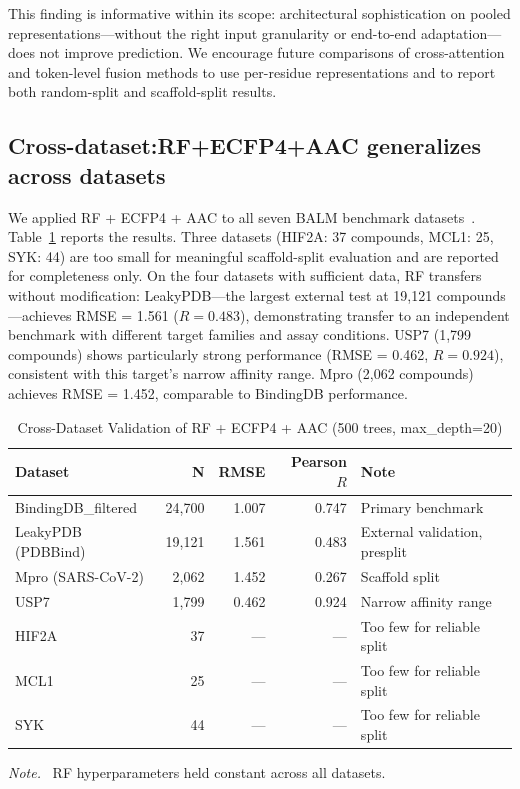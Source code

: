 \documentclass[pmlr,twocolumn]{jmlr}
\newcommand{\tablenote}[1]{%
  \vspace{4pt}%
  \begin{minipage}{0.95\linewidth}%
    \footnotesize\raggedright\emph{Note.}~#1\par%
  \end{minipage}%
}
\begin{document}
This finding is informative within its scope: architectural sophistication on pooled representations---without the right input granularity or end-to-end adaptation---does not improve prediction. We encourage future comparisons of cross-attention and token-level fusion methods to use per-residue representations and to report both random-split and scaffold-split results.

\subsection{Cross-dataset:RF+ECFP4+AAC generalizes across datasets}
\label{sec:cross_dataset}

We applied RF + ECFP4 + AAC to all seven BALM benchmark datasets~\citep{balm2024}. Table~\ref{tab:cross_dataset} reports the results. Three datasets (HIF2A: 37 compounds, MCL1: 25, SYK: 44) are too small for meaningful scaffold-split evaluation and are reported for completeness only. On the four datasets with sufficient data, RF transfers without modification: LeakyPDB---the largest external test at 19,121 compounds---achieves RMSE = 1.561 ($R = 0.483$), demonstrating transfer to an independent benchmark with different target families and assay conditions. USP7 (1,799 compounds) shows particularly strong performance (RMSE = 0.462, $R = 0.924$), consistent with this target's narrow affinity range. Mpro (2,062 compounds) achieves RMSE = 1.452, comparable to BindingDB performance.

\begin{table}[t]
\centering
\small
\caption{Cross-Dataset Validation of RF + ECFP4 + AAC (500 trees, max\_depth=20)}
\label{tab:cross_dataset}
\begin{tabular}{lrrrl}
\toprule
\textbf{Dataset} & \textbf{N} & \textbf{RMSE} & \textbf{Pearson $R$} & \textbf{Note} \\
\midrule
BindingDB\_filtered & 24,700 & 1.007 & 0.747 & Primary benchmark \\
LeakyPDB (PDBBind)  & 19,121 & 1.561 & 0.483 & External validation, presplit \\
Mpro (SARS-CoV-2)   & 2,062  & 1.452 & 0.267 & Scaffold split \\
USP7                & 1,799  & 0.462 & 0.924 & Narrow affinity range \\
HIF2A               & 37     & ---   & ---   & Too few for reliable split \\
MCL1                & 25     & ---   & ---   & Too few for reliable split \\
SYK                 & 44     & ---   & ---   & Too few for reliable split \\
\bottomrule
\end{tabular}
\tablenote{%
  RF hyperparameters held constant across all datasets.
}
\end{table}
\end{document}
